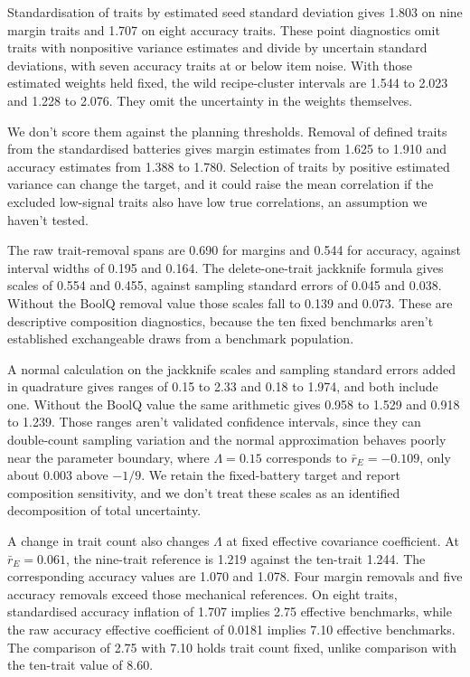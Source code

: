 Standardisation of traits by estimated seed standard deviation gives 1.803 on nine margin traits and 1.707 on eight accuracy traits. These point diagnostics omit traits with nonpositive variance estimates and divide by uncertain standard deviations, with seven accuracy traits at or below item noise. With those estimated weights held fixed, the wild recipe-cluster intervals are 1.544 to 2.023 and 1.228 to 2.076. They omit the uncertainty in the weights themselves.

We don't score them against the planning thresholds. Removal of defined traits from the standardised batteries gives margin estimates from 1.625 to 1.910 and accuracy estimates from 1.388 to 1.780. Selection of traits by positive estimated variance can change the target, and it could raise the mean correlation if the excluded low-signal traits also have low true correlations, an assumption we haven't tested.

The raw trait-removal spans are 0.690 for margins and 0.544 for accuracy, against interval widths of 0.195 and 0.164. The delete-one-trait jackknife formula gives scales of 0.554 and 0.455, against sampling standard errors of 0.045 and 0.038. Without the BoolQ removal value those scales fall to 0.139 and 0.073. These are descriptive composition diagnostics, because the ten fixed benchmarks aren't established exchangeable draws from a benchmark population.

A normal calculation on the jackknife scales and sampling standard errors added in quadrature gives ranges of 0.15 to 2.33 and 0.18 to 1.974, and both include one. Without the BoolQ value the same arithmetic gives 0.958 to 1.529 and 0.918 to 1.239. Those ranges aren't validated confidence intervals, since they can double-count sampling variation and the normal approximation behaves poorly near the parameter boundary, where $\Lambda=0.15$ corresponds to $\bar r_E=-0.109$, only about 0.003 above $-1/9$. We retain the fixed-battery target and report composition sensitivity, and we don't treat these scales as an identified decomposition of total uncertainty.

A change in trait count also changes $\Lambda$ at fixed effective covariance coefficient. At $\bar r_E=0.061$, the nine-trait reference is 1.219 against the ten-trait 1.244. The corresponding accuracy values are 1.070 and 1.078. Four margin removals and five accuracy removals exceed those mechanical references. On eight traits, standardised accuracy inflation of 1.707 implies 2.75 effective benchmarks, while the raw accuracy effective coefficient of 0.0181 implies 7.10 effective benchmarks. The comparison of 2.75 with 7.10 holds trait count fixed, unlike comparison with the ten-trait value of 8.60.

